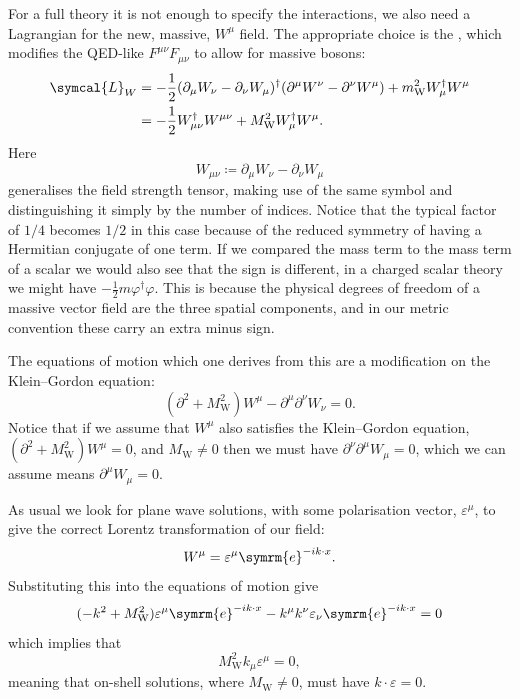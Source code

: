 \documentclass[fleqn]{NotesClass}
\newcommand{\Pparticle}[1]{\mathrm{#1}}
\newcommand{\PW}{\ensuremath{\Pparticle{W}}}
\newcommand{\e}{\symrm{e}}
\newcommand{\hermit}{\dagger}
\newcommand{\lagrangianDensity}{\symcal{L}}
\newcommand{\dalembertian}{\partial^2}
\begin{document}
    For a full theory it is not enough to specify the interactions, we also need a Lagrangian for the new, massive, \(W^\mu\) field.
    The appropriate choice is the , which modifies the QED-like \(F^{\mu\nu}F_{\mu\nu}\) to allow for massive bosons:
    \begin{align}
        \lagrangianDensity_{W} &= -\frac{1}{2}(\partial_\mu W_\nu - \partial_\nu W_\mu)^\hermit (\partial^\mu W^\nu - \partial^\nu W^\mu) + m_{\PW}^2 W_\mu^\hermit W^\mu\\
        &= -\frac{1}{2}W_{\mu\nu}^\hermit W^{\mu\nu} + M_{\PW}^2W_\mu^\hermit W^\mu.
    \end{align}
    Here
    \begin{equation}
        W_{\mu\nu} \coloneqq \partial_\mu W_\nu - \partial_\nu W_\mu
    \end{equation}
    generalises the field strength tensor, making use of the same symbol and distinguishing it simply by the number of indices.
    Notice that the typical factor of \(1/4\) becomes \(1/2\) in this case because of the reduced symmetry of having a Hermitian conjugate of one term.
    If we compared the mass term to the mass term of a scalar we would also see that the sign is different, in a charged scalar theory we might have \(-\tfrac{1}{2}m\varphi^\hermit \varphi\).
    This is because the physical degrees of freedom of a massive vector field are the three spatial components, and in our metric convention these carry an extra minus sign.
    
    The equations of motion which one derives from this are a modification on the Klein--Gordon equation:
    \begin{equation}
        (\dalembertian + M_{\PW}^2) W^\mu - \partial^\mu \partial^\nu W_\nu = 0.
    \end{equation}
    Notice that if we assume that \(W^\mu\) also satisfies the Klein--Gordon equation, \((\dalembertian + M_{\PW}^2)W^\mu = 0\), and \(M_{\PW} \ne 0\) then we must have \(\partial^\nu \partial^\mu W_\mu = 0\), which we can assume means \(\partial^\mu W_\mu = 0\).
    
    As usual we look for plane wave solutions, with some polarisation vector, \(\varepsilon^\mu\), to give the correct Lorentz transformation of our field:
    \begin{equation}
        W^\mu = \varepsilon^\mu\e^{-ik \cdot x}.
    \end{equation}
    Substituting this into the equations of motion give
    \begin{equation}
        (-k^2 + M_{\PW}^2)\varepsilon^\mu \e^{-ik\cdot x} - k^\mu k^\nu \varepsilon_\nu \e^{-ik\cdot x} = 0
    \end{equation}
    which implies that
    \begin{equation}
        M_{\PW}^2 k_\mu \varepsilon^\mu = 0,
    \end{equation}
    meaning that on-shell solutions, where \(M_{\PW} \ne 0\), must have \(k \cdot \varepsilon = 0\).
    
\end{document}
